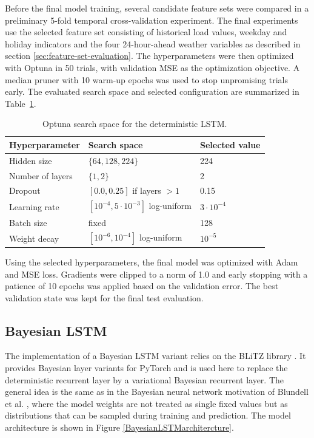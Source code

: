 \documentclass[Master,english,IEEE]{twbook}
\begin{document}
Before the final model training, several candidate feature sets were compared in a preliminary 5-fold temporal cross-validation experiment. The final experiments use the selected feature set consisting of historical load values, weekday and holiday indicators and the four 24-hour-ahead weather variables as described in section \ref{sec:feature-set-evaluation}. The hyperparameters were then optimized with Optuna in 50 trials, with validation MSE as the optimization objective. A median pruner with 10 warm-up epochs was used to stop unpromising trials early. The evaluated search space and selected configuration are summarized in Table~\ref{tabLstmHyperparameterSearch}.


\begin{table}[!htbp]
\centering
\caption{Optuna search space for the deterministic LSTM.}
\label{tabLstmHyperparameterSearch}
\begin{tabular}{lll}
\hline
Hyperparameter & Search space & Selected value \\
\hline
Hidden size & $\{64, 128, 224\}$ & 224 \\
Number of layers & $\{1, 2\}$ & 2 \\
Dropout & $[0.0, 0.25]$ if layers $>1$ & 0.15 \\
Learning rate & $[10^{-4}, 5 \cdot 10^{-3}]$ log-uniform & $3 \cdot 10^{-4}$ \\
Batch size & fixed & 128 \\
Weight decay & $[10^{-6}, 10^{-4}]$ log-uniform & $10^{-5}$ \\
\hline
\end{tabular}
\end{table}

Using the selected hyperparameters, the final model was optimized with Adam and MSE loss. Gradients were clipped to a norm of 1.0 and early stopping with a patience of 10 epochs was applied based on the validation error. The best validation state was kept for the final test evaluation.


\subsection{Bayesian LSTM}
\label{sec:bayesian-lstm}

The implementation of a Bayesian LSTM variant relies on the BLiTZ library \cite{pieroespositoBLiTZBayesianLayers2020}. It provides Bayesian layer variants for PyTorch and is used here to replace the deterministic recurrent layer by a variational Bayesian recurrent layer. The general idea is the same as in the Bayesian neural network motivation of Blundell et al. \cite{blundellWeightUncertaintyNeural2015}, where the model weights are not treated as single fixed values but as distributions that can be sampled during training and prediction. The model architecture is shown in Figure \ref{BayesianLSTMarchitercture}. 
\end{document}
